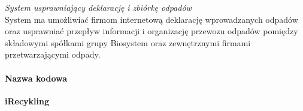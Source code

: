 

\emph{System usprawniający deklarację i zbiórkę odpadów} \\
System ma umożliwiać firmom internetową deklarację wprowadzanych odpadów oraz usprawniać przepływ informacji i organizację przewozu odpadów pomiędzy składowymi spółkami grupy Biosystem oraz zewnętrznymi firmami przetwarzającymi odpady.
\paragraph{Nazwa kodowa} \textbf{iRecykling}